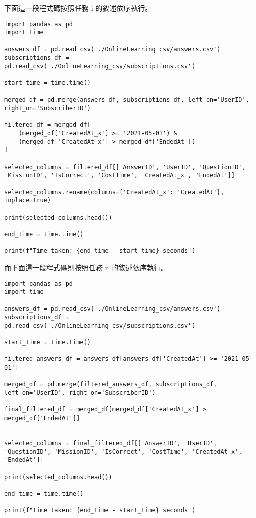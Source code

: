 \documentclass{article}
\begin{document}
下面這一段程式碼按照任務 i 的敘述依序執行。
\begin{verbatim}
import pandas as pd
import time

answers_df = pd.read_csv('./OnlineLearning_csv/answers.csv')
subscriptions_df = pd.read_csv('./OnlineLearning_csv/subscriptions.csv')

start_time = time.time()

merged_df = pd.merge(answers_df, subscriptions_df, left_on='UserID', right_on='SubscriberID')

filtered_df = merged_df[
    (merged_df['CreatedAt_x'] >= '2021-05-01') & 
    (merged_df['CreatedAt_x'] > merged_df['EndedAt'])
]

selected_columns = filtered_df[['AnswerID', 'UserID', 'QuestionID', 'MissionID', 'IsCorrect', 'CostTime', 'CreatedAt_x', 'EndedAt']]

selected_columns.rename(columns={'CreatedAt_x': 'CreatedAt'}, inplace=True)

print(selected_columns.head())

end_time = time.time()

print(f"Time taken: {end_time - start_time} seconds")
\end{verbatim}

而下面這一段程式碼則按照任務 ii 的敘述依序執行。
\begin{verbatim}
import pandas as pd
import time

answers_df = pd.read_csv('./OnlineLearning_csv/answers.csv')
subscriptions_df = pd.read_csv('./OnlineLearning_csv/subscriptions.csv')

start_time = time.time()

filtered_answers_df = answers_df[answers_df['CreatedAt'] >= '2021-05-01']

merged_df = pd.merge(filtered_answers_df, subscriptions_df, left_on='UserID', right_on='SubscriberID')

final_filtered_df = merged_df[merged_df['CreatedAt_x'] > merged_df['EndedAt']]


selected_columns = final_filtered_df[['AnswerID', 'UserID', 'QuestionID', 'MissionID', 'IsCorrect', 'CostTime', 'CreatedAt_x', 'EndedAt']]

print(selected_columns.head())

end_time = time.time()

print(f"Time taken: {end_time - start_time} seconds")
\end{verbatim}
\end{document}
